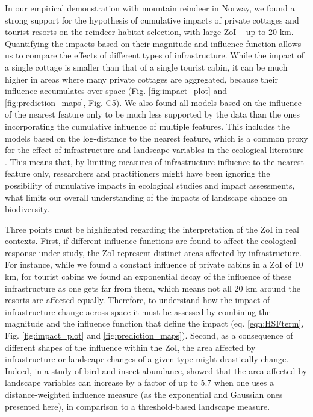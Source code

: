 \documentclass[titlepage]{article}
\begin{document}
In our empirical demonstration with mountain reindeer in Norway, we found a strong support for the hypothesis of cumulative impacts of private cottages and tourist resorts on the reindeer habitat selection, with large ZoI -- up to 20 km. Quantifying the impacts based on their magnitude and influence function allows us to compare the effects of different types of infrastructure. While the impact of a single cottage is smaller than that of a single tourist cabin, it can be much higher in areas where many private cottages are aggregated, because their influence accumulates over space (Fig. \ref{fig:impact_plot} and \ref{fig:prediction_maps}, Fig. C5). We also found all models based on the influence of the nearest feature only to be much less supported by the data than the ones incorporating the cumulative influence of multiple features. This includes the models based on the log-distance to the nearest feature, which is a common proxy for the effect of infrastructure and landscape variables in the ecological literature \citep[e.g.][]{torres_assessing_2016,polfus_identifying_2011}. This means that, by limiting measures of infrastructure influence to the nearest feature only, researchers and practitioners might have been ignoring the possibility of cumulative impacts in ecological studies and impact assessments, what limits our overall understanding of the impacts of landscape change on biodiversity.

Three points must be highlighted regarding the interpretation of the ZoI in real contexts.
First, if different influence functions are found to affect the ecological response under study, the ZoI represent distinct areas affected by infrastructure. For instance, while we found a constant influence of private cabins in a ZoI of 10 km, for tourist cabins we found an exponential decay of the influence of these infrastructure as one gets far from them, which means not all 20 km around the resorts are affected equally. Therefore, to understand how the impact of infrastructure change across space it must be assessed by combining the magnitude and the influence function that define the impact (eq. \ref{eqn:HSFterm}, Fig. \ref{fig:impact_plot} and \ref{fig:prediction_maps}). Second, as a consequence of different shapes of the influence within the ZoI, the area affected by infrastructure or landscape changes of a given type might drastically change. Indeed, in a study of bird and insect abundance, \citet{miguet_how_2017} showed that the area affected by landscape variables can increase by a factor of up to 5.7 when one uses a distance-weighted influence measure (as the exponential and Gaussian ones presented here), in comparison to a threshold-based landscape measure. 
\end{document}
